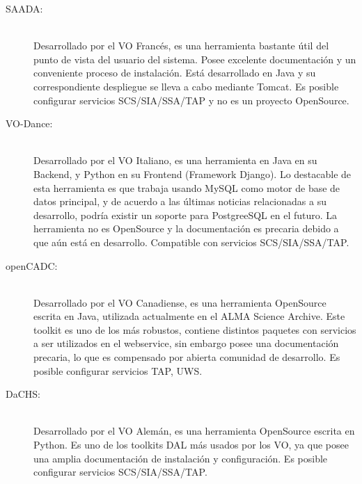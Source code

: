\begin{description}
    \item[SAADA:] \hfill \\
        Desarrollado por el VO Francés, es una herramienta bastante útil del punto
        de vista del usuario del sistema.
        Posee excelente documentación y un conveniente proceso de instalación.
        Está desarrollado en Java y su correspondiente despliegue se lleva a cabo
        mediante Tomcat.
        Es posible configurar servicios SCS/SIA/SSA/TAP y no es un proyecto
        OpenSource.

    \item[VO-Dance:] \hfill \\
        Desarrollado por el VO Italiano, es una herramienta en Java en su Backend,
        y Python en su Frontend (Framework Django).
        Lo destacable de esta herramienta es que trabaja usando MySQL como motor de
        base de datos principal, y de acuerdo a las últimas noticias relacionadas
        a su desarrollo, podría existir un soporte para PostgreeSQL en el futuro.
        La herramienta no es OpenSource y la documentación es precaria debido
        a que aún está en desarrollo. Compatible con servicios SCS/SIA/SSA/TAP.

    \item[openCADC:] \hfill \\
        Desarrollado por el VO Canadiense, es una herramienta OpenSource escrita en
        Java, utilizada actualmente en el ALMA Science Archive.
        Este toolkit es uno de los más robustos, contiene distintos paquetes con
        servicios a ser utilizados en el webservice, sin embargo posee una
        documentación precaria, lo que es compensado por abierta comunidad de
        desarrollo. Es posible configurar servicios TAP, UWS.

    \item[DaCHS:] \hfill \\
        Desarrollado por el VO Alemán, es una herramienta OpenSource escrita en
        Python.
        Es uno de los toolkits DAL más usados por los VO, ya que posee una amplia
        documentación de instalación y configuración.
        Es posible configurar servicios SCS/SIA/SSA/TAP.
\end{description}

